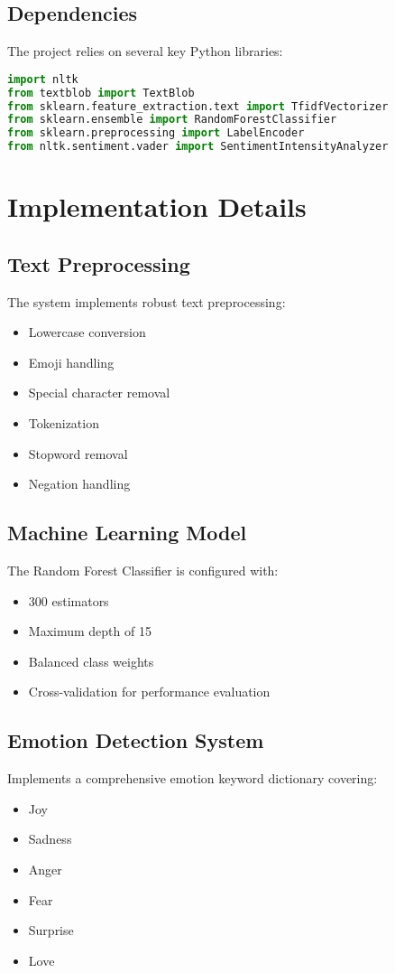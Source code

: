 \documentclass[12pt]{article}
\begin{document}
\subsection{Dependencies}
The project relies on several key Python libraries:
\begin{lstlisting}[language=Python]
import nltk
from textblob import TextBlob
from sklearn.feature_extraction.text import TfidfVectorizer
from sklearn.ensemble import RandomForestClassifier
from sklearn.preprocessing import LabelEncoder
from nltk.sentiment.vader import SentimentIntensityAnalyzer
\end{lstlisting}

\section{Implementation Details}
\subsection{Text Preprocessing}
The system implements robust text preprocessing:
\begin{itemize}
    \item Lowercase conversion
    \item Emoji handling
    \item Special character removal
    \item Tokenization
    \item Stopword removal
    \item Negation handling
\end{itemize}

\subsection{Machine Learning Model}
The Random Forest Classifier is configured with:
\begin{itemize}
    \item 300 estimators
    \item Maximum depth of 15
    \item Balanced class weights
    \item Cross-validation for performance evaluation
\end{itemize}

\subsection{Emotion Detection System}
Implements a comprehensive emotion keyword dictionary covering:
\begin{itemize}
    \item Joy
    \item Sadness
    \item Anger
    \item Fear
    \item Surprise
    \item Love
\end{itemize}
\end{document}
